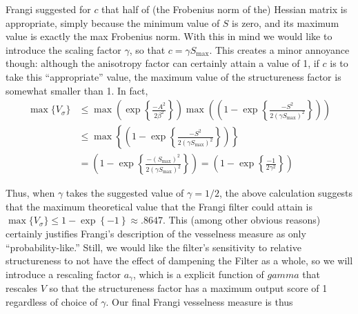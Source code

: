 Frangi suggested for $c$ that half of (the Frobenius norm of the) Hessian matrix is appropriate, simply because the minimum value of $S$ is zero, and its maximum value is exactly the max Frobenius norm. With this in mind we would like to introduce the scaling factor
$\gamma$, so that $ c = \gamma S_{\max}$. This creates a minor annoyance though: although the anisotropy factor can certainly attain a value of 1, if $c$ is to take this ``appropriate'' value, the maximum value of the structureness factor is somewhat smaller than 1. In fact,
\begin{equation}
\begin{aligned}
\max\{V_\sigma\} &\le \max\left(
\exp\left\{\frac{-A^2}{2\beta^2}\right\}
\right)
\max\left(
\left(1 - \exp\left\{\frac{-S^2}{2(\gamma S_{\max})^2}\right\}\right)
\right) \\
&\le \max\left\{
\left(1 - \exp\left\{\frac{-S^2}{2(\gamma S_{\max})^2}\right\}\right)
\right\} \\
&= 
\left(1 - \exp\left\{\frac{-(S_{\max})^2}{2(\gamma S_{\max})^2}\right\}
\right)
= \left(1 - \exp\left\{\frac{-1}{2\gamma^2}\right\}
\right)
\end{aligned}
\end{equation}

Thus, when $\gamma$ takes the suggested value of $\gamma = 1/2$, the above calculation suggests that
the maximum theoretical value that the Frangi filter could attain is
$ \max \{ V_\sigma \} \le 1 - \exp\left\{ -1 \right\} \approx .8647$.
This (among other obvious reasons) certainly justifies Frangi's description of the vesselness measure as only ``probability-like.'' Still, we would like the filter's sensitivity to relative structureness to not have the effect of dampening the Filter as a whole, so we will introduce a rescaling factor $a_\gamma$, which is a explicit function of $gamma$ that rescales $V$ so that the structureness factor has a maximum output score of 1 regardless of choice of $\gamma$. Our final Frangi vesselness measure is thus

